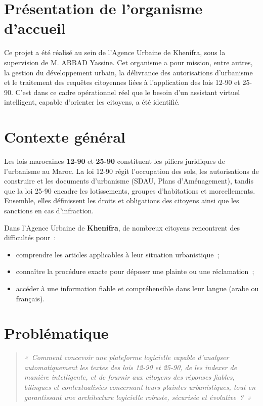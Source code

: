 \documentclass[12pt,a4paper]{report}
\begin{document}
\section{Présentation de l'organisme d'accueil}

Ce projet a été réalisé au sein de l'Agence Urbaine de Khenifra, sous la supervision de M. ABBAD Yassine. Cet organisme a pour mission, entre autres, la gestion du développement urbain, la délivrance des autorisations d'urbanisme et le traitement des requêtes citoyennes liées à l'application des lois 12-90 et 25-90. C'est dans ce cadre opérationnel réel que le besoin d'un assistant virtuel intelligent, capable d'orienter les citoyens, a été identifié.

\section{Contexte général}

Les lois marocaines \textbf{12-90} et \textbf{25-90} constituent les piliers juridiques de l'urbanisme au Maroc. La loi 12-90 régit l'occupation des sols, les autorisations de construire et les documents d'urbanisme (SDAU, Plans d'Aménagement), tandis que la loi 25-90 encadre les lotissements, groupes d'habitations et morcellements. Ensemble, elles définissent les droits et obligations des citoyens ainsi que les sanctions en cas d'infraction.

Dans l'Agence Urbaine de \textbf{Khenifra}, de nombreux citoyens rencontrent des difficultés pour~:
\begin{itemize}[label=\textbullet]
    \item comprendre les articles applicables à leur situation urbanistique~;
    \item connaître la procédure exacte pour déposer une plainte ou une réclamation~;
    \item accéder à une information fiable et compréhensible dans leur langue (arabe ou français).
\end{itemize}

\section{Problématique}

\begin{quote}
\itshape «~Comment concevoir une plateforme logicielle capable d'analyser automatiquement les textes des lois 12-90 et 25-90, de les indexer de manière intelligente, et de fournir aux citoyens des réponses fiables, bilingues et contextualisées concernant leurs plaintes urbanistiques, tout en garantissant une architecture logicielle robuste, sécurisée et évolutive~?~»
\end{quote}
\end{document}
